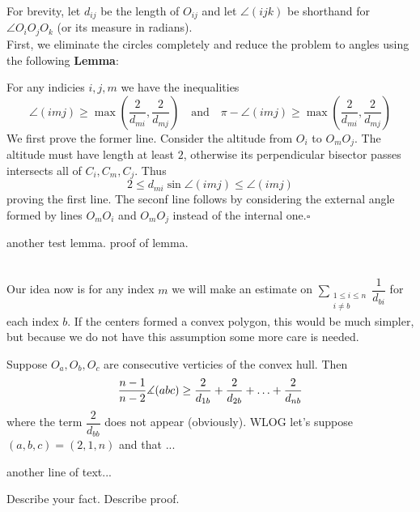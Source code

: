 \documentclass{article}
\begin{document}
        For brevity, let \(d_{ij}\) be the length of \(O_{ij}\) and let \(\angle(ijk)\) be shorthand for \(\angle O_iO_jO_k\) (or its measure in radians).
        \\
        First, we eliminate the circles completely and reduce the problem to angles using the following \textbf{\color{allanred} Lemma}:
        \\
        \begin{allanlemma}
            For any indicies \(i,j,m\) we have the inequalities
            \[\angle(imj)\geq \max\left(\dfrac{2}{d_{mi}}, \dfrac{2}{d_{mj}}\right)\quad \mathrm{and} \quad \pi -\angle(imj)\geq \max\left(\dfrac{2}{d_{mi}}, \dfrac{2}{d_{mj}}\right)\]
            \sublemma
                We first prove the former line. Consider the altitude from \(O_i\) to \(O_mO_j\). The altitude must have length at least \(2\), otherwise its perpendicular bisector passes intersects all of \(C_i, C_m, C_j\). Thus
                \[2\leq d_{mi}\sin\angle(imj)\leq \angle(imj)\]
                proving the first line. The seconf line follows by considering the external angle formed by lines \(O_mO_i\) and \(O_mO_j\) instead of the internal one.\(\square\)
        \end{allanlemma}
        \showlemma
        \begin{allanlemma}
            another test lemma.
            \sublemma
                proof of lemma.
        \end{allanlemma}
        \showlemma
        \\
        Our idea now is for any index \(m\) we will make an estimate on \(\displaystyle \sum_{\substack{1\leq i\leq n\\i\neq b} }{\dfrac{1}{d_{bi}}} \) for each index \(b\). If the centers formed a convex polygon, this would be much simpler, but because we do not have this assumption some more care is needed.
        \begin{allanclaim}
            Suppose \(O_a,O_b,O_c\) are consecutive verticies of the convex hull. Then
            \[\dfrac{n-1}{n-2}\measuredangle(abc)\geq \dfrac{2}{d_{1b}}+\dfrac{2}{d_{2b}}+\ldots+\dfrac{2}{d_{nb}}\]
            where the term \(\displaystyle \dfrac{2}{d_{bb}}\) does not appear (obviously).
            \subclaim
                WLOG let's suppose \((a,b,c)=(2,1,n)\) and that ...
        \end{allanclaim}
        another line of text...
        \begin{allanfact}
            Describe your fact.
            \subfact
                Describe proof.
        \end{allanfact}
\end{document}
